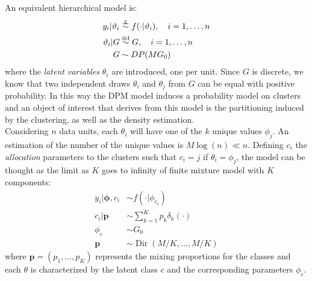 An equivalent hierarchical model is:
\begin{equation}
	\begin{aligned}\label{dpm-2}
	y_i | \theta_i &\indsim f(\cdot|\theta_i), \quad i=1,\dots,n \\
	\theta_i | G &\iidsim G, \quad i=1,\dots,n \\ 
	G &\sim DP(M G_0)
	\end{aligned}
\end{equation}
where the \emph{latent variables} $\theta_i$ are introduced, one per unit.
Since $G$ is discrete, we know that two independent draws $\theta_i$ and $\theta_j$ from $G$ can be equal with positive probability.
In this way the DPM model induces a probability model on clusters and an object of interest that derives from this model is the partitioning induced by the clustering, as well as the density estimation. \\
Considering $n$ data units, each $\theta_i$ will have one of the $k$ unique values $\phi_{j}$. An estimation of the number of the unique values is $M\log(n) \ll n$. Defining  $c_i$ the \textit{allocation} parameters to the clusters such that $c_i = j$ if $\theta_i = \phi_j$, the model can be thought as the limit as $K$ goes to infinity of
finite mixture model with $K$ components:
\begin{equation}
	\begin{aligned}\label{dpm-disc}
		y_{i}|\mathbf{\phi},c_{i} &\sim f(\cdot|\phi_{c_{i}}) \\
		c_{i}|\mathit{\mathbf{p}}&\sim \sum_{k=1}^K\mathit{p_k} \delta_k(\cdot) \\
		\phi_{c} & \sim G_{0} \\
		\mathbf{p} &\sim \operatorname{Dir}(M/K,\dots,M/K)
	\end{aligned}
\end{equation}
where $\mathbf{p}=(p_1,\dots,p_K)$ represents the mixing proportions for the classes and each $\theta$ is characterized by the latent class $c$ and the corresponding parameters $\phi_c$.

